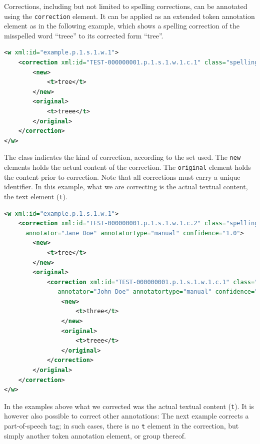 \documentclass[a4paper,12pt]{report}
\begin{document}
Corrections, including but not limited to spelling corrections, can be annotated using the \texttt{correction} element. It can be applied as an extended token annotation element as in the following example, which shows a spelling correction of the misspelled word ``treee'' to its corrected form ``tree''.

\begin{lstlisting}[language=xml]
<w xml:id="example.p.1.s.1.w.1">
    <correction xml:id="TEST-000000001.p.1.s.1.w.1.c.1" class="spelling">
        <new>
            <t>tree</t>
        </new>
        <original>
            <t>treee</t>
        </original>
    </correction>
</w>
\end{lstlisting}

The class indicates the kind of correction, according to the set used. The \texttt{new} elements holds the actual content of the correction. The \texttt{original} element holds the content prior to correction. Note that all corrections must carry a unique identifier. In this example, what we are correcting is the actual textual content, the text element (\texttt{t}).


\begin{lstlisting}[language=xml]
<w xml:id="example.p.1.s.1.w.1">
    <correction xml:id="TEST-000000001.p.1.s.1.w.1.c.2" class="spelling" 
      annotator="Jane Doe" annotatortype="manual" confidence="1.0">
        <new>
            <t>tree</t>
        </new>
        <original>
            <correction xml:id="TEST-000000001.p.1.s.1.w.1.c.1" class="spelling"
               annotator="John Doe" annotatortype="manual" confidence="0.6">
                <new>
                    <t>three</t>
                </new>
                <original>
                    <t>treee</t>
                </original>
            </correction>
        </original>
    </correction>
</w>
\end{lstlisting}

In the examples above what we corrected was the actual textual content (\texttt{t}). It is however also possible to correct other annotations: The next example corrects a part-of-speech tag; in such cases, there is no \texttt{t} element in the correction, but simply another token annotation element, or group thereof.
\end{document}
